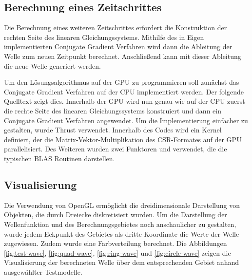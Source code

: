 \documentclass[crop=false,10pt,ngerman]{standalone}
\begin{document}
    \subsection{Berechnung eines Zeitschrittes} %
    \label{sub:konstruktion_des_linearen_gleichungssystems}
      Die Berechnung eines weiteren Zeitschrittes erfordert die Konstruktion der rechten Seite des linearen Gleichungssystems.
      Mithilfe des in Eigen implementierten Conjugate Gradient Verfahren wird dann die Ableitung der Welle zum neuen Zeitpunkt berechnet.
      Anschließend kann mit dieser Ableitung die neue Welle generiert werden.

      Um den Lösungsalgorithmus auf der GPU zu programmieren soll zunächst das Conjugate Gradient Verfahren auf der CPU implementiert werden.
      Der folgende Quelltext zeigt dies.
      Innerhalb der GPU wird nun genau wie auf der CPU zuerst die rechte Seite des linearen Gleichungssystems konstruiert und dann ein Conjugate Gradient Verfahren angewendet.
      Um die Implementierung einfacher zu gestalten, wurde Thrust verwendet.
      Innerhalb des Codes wird ein Kernel definiert, der die Matrix-Vektor-Multiplikation des CSR-Formates auf der GPU parallelisiert.
      Des Weiteren wurden zwei Funktoren  und  verwendet, die die typischen BLAS Routinen darstellen.

    \subsection{Visualisierung} %
    \label{sub:visualisierung}

      Die Verwendung von OpenGL ermöglicht die dreidimensionale Darstellung von Objekten, die durch Dreiecke diskretisiert wurden.
      Um die Darstellung der Wellenfunktion und des Berechnungsgebietes noch anschaulicher zu gestalten, wurde jedem Eckpunkt des Gebietes als dritte Koordinate die Werte der Welle zugewiesen.
      Zudem wurde eine Farbverteilung berechnet.
      Die Abbildungen \ref{fig:test-wave}, \ref{fig:quad-wave}, \ref{fig:ring-wave} und \ref{fig:circle-wave} zeigen die Visualisierung der berechneten Welle über dem entsprechenden Gebiet anhand ausgewählter Testmodelle.
\end{document}
